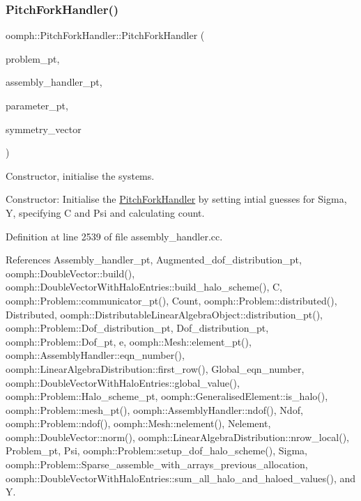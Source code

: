 \subsubsection{\texorpdfstring{Pitch\+Fork\+Handler()}{PitchForkHandler()}}
{\footnotesize\ttfamily oomph\+::\+Pitch\+Fork\+Handler\+::\+Pitch\+Fork\+Handler (\begin{DoxyParamCaption}\item[{\hyperlink{classoomph_1_1Problem}{Problem} $\ast$const \&}]{problem\+\_\+pt,  }\item[{\hyperlink{classoomph_1_1AssemblyHandler}{Assembly\+Handler} $\ast$const \&}]{assembly\+\_\+handler\+\_\+pt,  }\item[{double $\ast$const \&}]{parameter\+\_\+pt,  }\item[{const \hyperlink{classoomph_1_1DoubleVector}{Double\+Vector} \&}]{symmetry\+\_\+vector }\end{DoxyParamCaption})}



Constructor, initialise the systems. 

Constructor\+: Initialise the \hyperlink{classoomph_1_1PitchForkHandler}{Pitch\+Fork\+Handler} by setting intial guesses for Sigma, Y, specifying C and Psi and calculating count. 

Definition at line 2539 of file assembly\+\_\+handler.\+cc.



References Assembly\+\_\+handler\+\_\+pt, Augmented\+\_\+dof\+\_\+distribution\+\_\+pt, oomph\+::\+Double\+Vector\+::build(), oomph\+::\+Double\+Vector\+With\+Halo\+Entries\+::build\+\_\+halo\+\_\+scheme(), C, oomph\+::\+Problem\+::communicator\+\_\+pt(), Count, oomph\+::\+Problem\+::distributed(), Distributed, oomph\+::\+Distributable\+Linear\+Algebra\+Object\+::distribution\+\_\+pt(), oomph\+::\+Problem\+::\+Dof\+\_\+distribution\+\_\+pt, Dof\+\_\+distribution\+\_\+pt, oomph\+::\+Problem\+::\+Dof\+\_\+pt, e, oomph\+::\+Mesh\+::element\+\_\+pt(), oomph\+::\+Assembly\+Handler\+::eqn\+\_\+number(), oomph\+::\+Linear\+Algebra\+Distribution\+::first\+\_\+row(), Global\+\_\+eqn\+\_\+number, oomph\+::\+Double\+Vector\+With\+Halo\+Entries\+::global\+\_\+value(), oomph\+::\+Problem\+::\+Halo\+\_\+scheme\+\_\+pt, oomph\+::\+Generalised\+Element\+::is\+\_\+halo(), oomph\+::\+Problem\+::mesh\+\_\+pt(), oomph\+::\+Assembly\+Handler\+::ndof(), Ndof, oomph\+::\+Problem\+::ndof(), oomph\+::\+Mesh\+::nelement(), Nelement, oomph\+::\+Double\+Vector\+::norm(), oomph\+::\+Linear\+Algebra\+Distribution\+::nrow\+\_\+local(), Problem\+\_\+pt, Psi, oomph\+::\+Problem\+::setup\+\_\+dof\+\_\+halo\+\_\+scheme(), Sigma, oomph\+::\+Problem\+::\+Sparse\+\_\+assemble\+\_\+with\+\_\+arrays\+\_\+previous\+\_\+allocation, oomph\+::\+Double\+Vector\+With\+Halo\+Entries\+::sum\+\_\+all\+\_\+halo\+\_\+and\+\_\+haloed\+\_\+values(), and Y.


